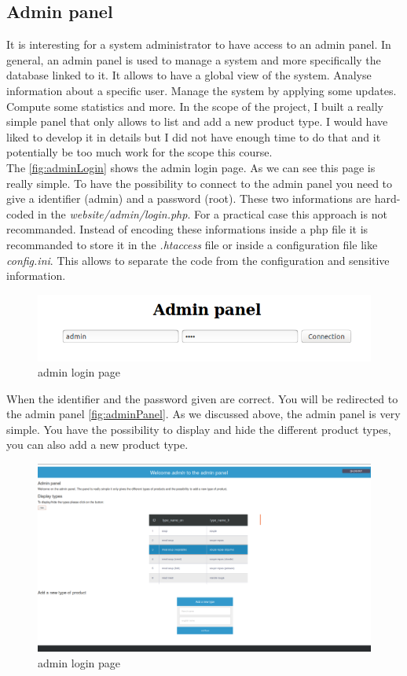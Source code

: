 \subsection{Admin panel}
It is interesting for a system administrator to have access to an admin panel. In general, an admin panel is used to manage a system and more specifically the database linked to it. It allows to have a global view of the system. Analyse information about a specific user. Manage the system by applying some updates. Compute some statistics and more. In the scope of the project, I built a really simple panel that only allows to list and add a new product type. I would have liked to develop it in details but I did not have enough time to do that and it potentially be too much work for the scope this course.\\

The \autoref{fig:adminLogin} shows the admin login page. As we can see this page is really simple. To have the possibility to connect to the admin panel you need to give a identifier (admin) and a password (root). These two informations are hard-coded in the \textit{website/admin/login.php}. For a practical case this approach is not recommanded. Instead of encoding these informations inside a php file it is recommanded to store it in the \textit{.htaccess} file or inside a configuration file like \textit{config.ini}. This allows to separate the code from the configuration and sensitive information.
\begin{figure}[H]
\centering
\includegraphics[scale=0.4]{./images/adminLogin.png}
\caption{admin login page}
\label{fig:adminLogin}
\end{figure}

When the identifier and the password given are correct. You will be redirected to the admin panel \autoref{fig:adminPanel}. As we discussed above, the admin panel is very simple. You have the possibility to display and hide the different product types, you can also add a new product type.
\begin{figure}[H]
\centering
\includegraphics[scale=0.25]{./images/adminPanel.png}
\caption{admin login page}
\label{fig:adminPanel}
\end{figure}

